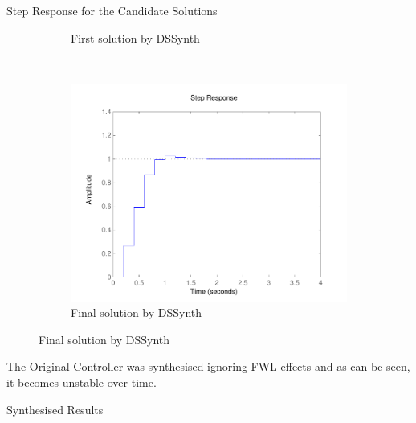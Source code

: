 \documentclass{beamer}
\newcommand\tool{{\sf DSSynth}\xspace}
\begin{document}
\begin{frame}[fragile]{Step Response for the Candidate Solutions}
\begin{figure}
\begin{subfigure}[b]{0.3\textwidth}
        \caption{First solution by \tool}
        \label{fig:step1}
    \end{subfigure}
    ~
    \begin{subfigure}[b]{0.3\textwidth}
        \includegraphics[width=\textwidth]{figures/runningexample_step2.pdf}
        \caption{Final solution by \tool}
        \label{fig:step2}
    \end{subfigure}
\end{figure}
The Original Controller was synthesised ignoring FWL effects and as can be seen, it becomes unstable over time.
\end{frame}
%
\begin{frame}[fragile]{Synthesised Results}
\begin{figure}
\end{figure}
\end{frame}
\end{document}
